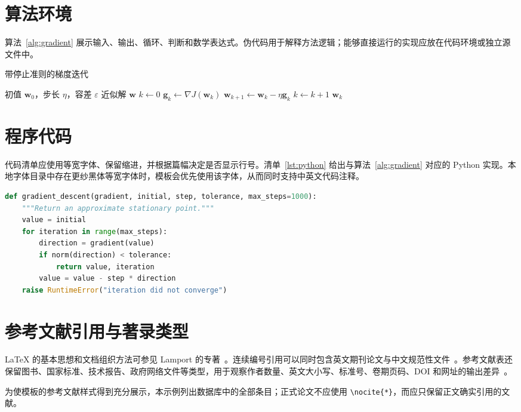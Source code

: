 \section{算法环境}
算法~\ref{alg:gradient} 展示输入、输出、循环、判断和数学表达式。伪代码用于解释方法逻辑；能够直接运行的实现应放在代码环境或独立源文件中。

\begin{algorithm}[htbp]
  \caption{带停止准则的梯度迭代}
  \label{alg:gradient}
  \begin{algorithmic}[1]
    \REQUIRE 初值 $\boldsymbol{w}_0$，步长 $\eta$，容差 $\varepsilon$
    \ENSURE 近似解 $\boldsymbol{w}$
    \STATE $k\leftarrow 0$
    \REPEAT
      \STATE $\boldsymbol{g}_k\leftarrow\nabla J(\boldsymbol{w}_k)$
      \STATE $\boldsymbol{w}_{k+1}\leftarrow\boldsymbol{w}_k-\eta\boldsymbol{g}_k$
      \STATE $k\leftarrow k+1$
    \RETURN $\boldsymbol{w}_k$
  \end{algorithmic}
\end{algorithm}

\section{程序代码}
代码清单应使用等宽字体、保留缩进，并根据篇幅决定是否显示行号。清单~\ref{lst:python} 给出与算法~\ref{alg:gradient} 对应的 Python 实现。本地字体目录中存在更纱黑体等宽字体时，模板会优先使用该字体，从而同时支持中英文代码注释。

\begin{lstlisting}[language=Python,caption={梯度迭代的 Python 实现},label={lst:python}]
def gradient_descent(gradient, initial, step, tolerance, max_steps=1000):
    """Return an approximate stationary point."""
    value = initial
    for iteration in range(max_steps):
        direction = gradient(value)
        if norm(direction) < tolerance:
            return value, iteration
        value = value - step * direction
    raise RuntimeError("iteration did not converge")
\end{lstlisting}

\section{参考文献引用与著录类型}
LaTeX 的基本思想和文档组织方法可参见 Lamport 的专著~\cite{lamport1994latex}。连续编号引用可以同时包含英文期刊论文与中文规范性文件~\cite{rahardjo1995,zhang2024,bjut2023guide}。参考文献表还保留图书、国家标准、技术报告、政府网络文件等类型，用于观察作者数量、英文大小写、标准号、卷期页码、DOI 和网址的输出差异~\cite{fredlund1993,gbt7713_1_2025,gbt7714_2025,zgqhgb2025,stateCouncil2025}。

为使模板的参考文献样式得到充分展示，本示例列出数据库中的全部条目；正式论文不应使用 \verb|\nocite{*}|，而应只保留正文确实引用的文献。
\nocite{*}
